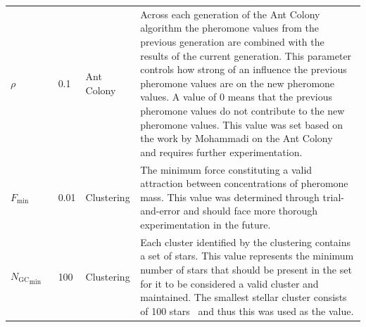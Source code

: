 \begin{table}[H]
{\begin{tabular}{l l l p{10cm}}
            $\rho$                         & 0.1   & Ant Colony & Across each generation of the Ant Colony algorithm the pheromone values from the previous generation are combined with the results of the current generation. This parameter controls how strong of an influence the previous pheromone values are on the new pheromone values. A value of $0$ means that the previous pheromone values do not contribute to the new pheromone values. This value was set based on the work by Mohammadi on the Ant Colony~\cite{AntColonyMohammadi} and requires further experimentation.                                                                         \\

            $F_{\text{min attraction}}$    & 0.01  & Clustering & The minimum force constituting a valid attraction between concentrations of pheromone mass. This value was determined through trial-and-error and should face more thorough experimentation in the future.                                                                                                                                                                                                                                                                                                                                                                                         \\
            ${N_{\text{GC}}}_{\text{min}}$ & 100   & Clustering & Each cluster identified by the clustering contains a set of stars. This value represents the minimum number of stars that should be present in the set for it to be considered a valid cluster and maintained. The smallest stellar cluster consists of 100 stars~\cite{Dugan2019} and thus this was used as the value.                                                                                                                                                                                                                                                                            \\
            \bottomrule
        \end{tabular}
    }
\end{table}
\renewcommand{\arraystretch}{1}
